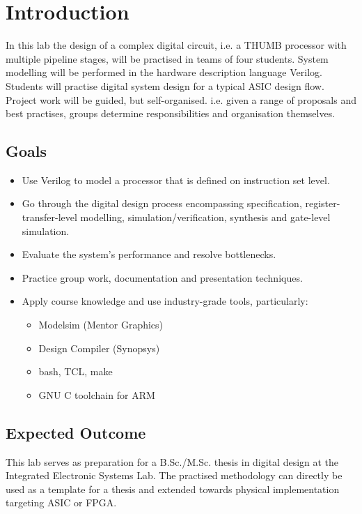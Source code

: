 \newpage
\thispagestyle{fancy}
\section{Introduction}
In this lab the design of a complex digital circuit, i.e. a THUMB processor with multiple pipeline stages, will be practised in teams of four students. System modelling will be performed in the hardware description language Verilog. Students will practise digital system design for a typical ASIC design flow.
Project work will be guided, but self-organised. i.e. given a range of proposals and best practises, groups determine responsibilities and organisation themselves.

\subsection{Goals}
\begin{itemize}
\item Use Verilog to model a processor that is defined on instruction set level.
\item Go through the digital design process encompassing specification, register-transfer-level modelling, simulation/verification, synthesis and gate-level simulation.
\item Evaluate the system's performance and resolve bottlenecks.
\item Practice group work, documentation and presentation techniques.
\item Apply course knowledge and use industry-grade tools, particularly:
	\begin{itemize}
	\item Modelsim  (Mentor Graphics)
	\item Design Compiler (Synopsys)
	\item bash, TCL, make
	\item GNU C toolchain for ARM
	\end{itemize}
\end{itemize}


\subsection{Expected Outcome}
This lab serves as preparation for a B.Sc./M.Sc. thesis in digital design at the Integrated Electronic Systems Lab. The practised methodology can directly be used as a template for a thesis and extended towards physical implementation targeting ASIC or FPGA.